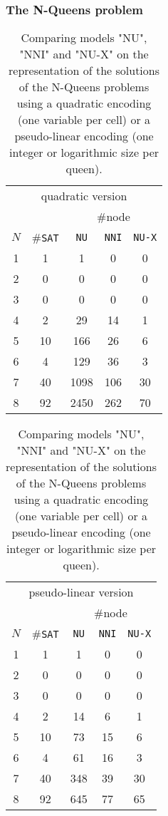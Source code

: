 \documentclass[a4paper,10pt]{article}
\begin{document}
\subsubsection{The N-Queens problem}



\begin{table}[h]
\center
\begin{tabular}{|c | c | c | c | c |}
\multicolumn{5}{|c|}{quadratic version} \\
& & \multicolumn{3}{|c|}{\#node} \\
$N$ & \#\texttt{SAT} & \texttt{NU} & \texttt{NNI} & \texttt{NU-X} \\ \hline
1   & 1              & 1           & 0            & 0             \\
2   & 0              & 0           & 0            & 0             \\
3   & 0              & 0           & 0            & 0             \\
4   & 2              & 29          & 14           & 1             \\
5   & 10             & 166         & 26           & 6             \\
6   & 4              & 129         & 36           & 3             \\
7   & 40             & 1098        & 106          & 30            \\
8   & 92             & 2450        & 262          & 70            \\
\end{tabular}
\begin{tabular}{|c | c | c | c | c |}
\multicolumn{5}{|c|}{pseudo-linear version} \\
& & \multicolumn{3}{|c|}{\#node} \\
$N$ & \#\texttt{SAT} & \texttt{NU} & \texttt{NNI} & \texttt{NU-X} \\ \hline
1   & 1              & 1           & 0            & 0             \\
2   & 0              & 0           & 0            & 0             \\
3   & 0              & 0           & 0            & 0             \\
4   & 2              & 14          & 6            & 1             \\
5   & 10             & 73          & 15           & 6             \\
6   & 4              & 61          & 16           & 3             \\
7   & 40             & 348         & 39           & 30            \\
8   & 92             & 645         & 77           & 65            \\
\end{tabular}
\caption{Comparing models "NU", "NNI" and "NU-X" on the representation of the solutions of the N-Queens problems using a quadratic encoding (one variable per cell) or a pseudo-linear encoding (one integer or logarithmic size per queen).}
\label{table-nqueens}
\end{table}
\end{document}
